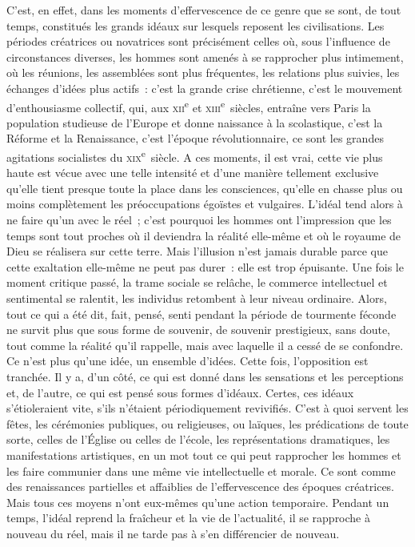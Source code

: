 \documentclass[french,twoside]{book} %
\begin{document}
C’est, en effet, dans les moments d’effervescence de ce genre que se sont, de tout temps, constitués les grands idéaux sur lesquels reposent les civilisations. Les périodes créatrices ou novatrices sont précisément celles où, sous l’influence de circonstances diverses, les hommes sont amenés à se rapprocher plus intimement, où les réunions, les assemblées sont plus fréquentes, les relations plus suivies, les échanges d’idées plus actifs : c’est la grande crise chrétienne, c’est le mouvement d’enthousiasme collectif, qui, aux \textsc{xii}\textsuperscript{e} et \textsc{xiii}\textsuperscript{e} siècles, entraîne vers Paris la population studieuse de l’Europe et donne naissance à la scolastique, c’est la Réforme et la Renaissance, c’est l’époque révolutionnaire, ce sont les grandes agitations socialistes du \textsc{xix}\textsuperscript{e} siècle. A ces moments, il est vrai, cette vie plus haute est vécue avec une telle intensité et d’une manière tellement exclusive qu’elle tient presque toute la place dans les consciences, qu’elle en chasse plus ou moins complètement les préoccupations égoïstes et vulgaires. L’idéal tend alors à ne faire qu’un avec le réel ; c’est pourquoi les hommes ont l’impression que les temps sont tout proches où il deviendra la réalité elle-même et où le royaume de Dieu se réalisera sur cette terre. Mais l’illusion n’est jamais durable parce que cette exaltation elle-même ne peut pas durer : elle est trop épuisante. Une fois le moment critique passé, la trame sociale se relâche, le commerce intellectuel et sentimental se ralentit, les individus retombent à leur niveau ordinaire. Alors, tout ce qui a été dit, fait, pensé, senti pendant la période de tourmente féconde ne survit plus que sous forme de souvenir, de souvenir prestigieux, sans doute, tout comme la réalité qu’il rappelle, mais avec laquelle il a cessé de se confondre. Ce n’est plus qu’une idée, un ensemble d’idées. Cette fois, l’opposition est tranchée. Il y a, d’un côté, ce qui est donné dans les sensations et les perceptions et, de l’autre, ce qui est pensé sous formes d’idéaux. Certes, ces idéaux s’étioleraient vite, s’ils n’étaient périodiquement revivifiés. C’est à quoi servent les fêtes, les cérémonies publiques, ou religieuses, ou laïques, les prédications de toute sorte, celles de l’Église ou celles de l’école, les représentations dramatiques, les manifestations artistiques, en un mot tout ce qui peut rapprocher les hommes et les faire communier dans une même vie intellectuelle et morale. Ce sont comme des renaissances partielles et affaiblies de l’effervescence des époques créatrices. Mais tous ces moyens n’ont eux-mêmes qu’une action temporaire. Pendant un temps, l’idéal reprend la fraîcheur et la vie de l’actualité, il se rapproche à nouveau du réel, mais il ne tarde pas à s’en différencier de nouveau.\par
\end{document}
